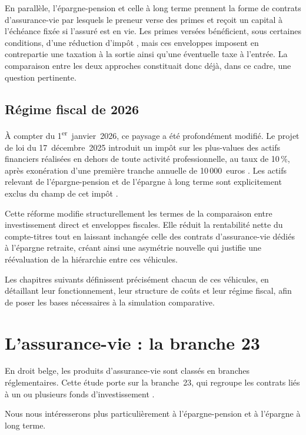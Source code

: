 ﻿\documentclass[12pt, a4paper]{article}
\begin{document}
En parallèle, l'épargne-pension et celle à long terme prennent la forme de
contrats d'assurance-vie par lesquels le preneur verse des primes et reçoit
un capital à l'échéance fixée si l'assuré est en vie. Les primes versées bénéficient,
sous certaines conditions, d'une réduction d'impôt \cite[p.~115-116]{Binon2016},
mais ces enveloppes imposent en contrepartie une taxation à la sortie ainsi qu'une
éventuelle taxe à l'entrée. La comparaison entre les deux
approches constituait donc déjà, dans ce cadre, une question pertinente.

\subsection{Régime fiscal de 2026}
\label{subsec:regime_fiscal_2026}

À compter du 1\textsuperscript{er}~janvier~2026, ce paysage a été profondément
modifié. Le projet de loi du 17~décembre~2025 introduit un impôt sur les plus-values des
actifs financiers réalisées en dehors de toute activité professionnelle, au taux de
10\,\%, après exonération d'une première tranche annuelle de 10\,000~euros
\cite[p.~4-5, 9]{chambre2025pv_actifs}. Les actifs relevant de l'épargne-pension et
de l'épargne à long terme sont explicitement exclus du champ de cet impôt
\cite[p.~39]{chambre2025pv_actifs}.

Cette réforme modifie structurellement les termes de la comparaison entre
investissement direct et enveloppes fiscales. Elle réduit la rentabilité nette du
compte-titres tout en laissant inchangée celle des contrats d'assurance-vie dédiés à
l'épargne retraite, créant ainsi une asymétrie nouvelle qui justifie une réévaluation
de la hiérarchie entre ces véhicules.

Les chapitres suivants définissent précisément chacun de ces véhicules, en détaillant
leur fonctionnement, leur structure de coûts et leur régime fiscal, afin de poser les
bases nécessaires à la simulation comparative.

\newpage
\section{L'assurance-vie : la branche 23}

En droit belge, les produits d'assurance-vie sont classés
en branches réglementaires. Cette étude porte sur la
branche~23, qui regroupe les contrats liés à un ou plusieurs
fonds d'investissement \cite[p.~130-132]{Binon2016}.

Nous nous intéresserons plus particulièrement à 
l'épargne-pension et à l'épargne à long terme.
\end{document}
